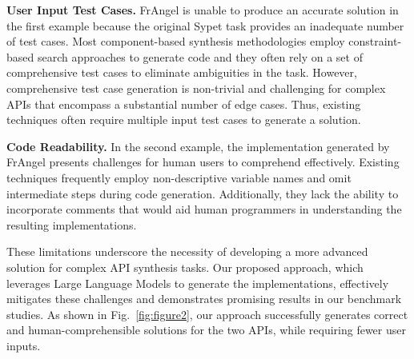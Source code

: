 \noindent\textbf{User Input Test Cases.}
FrAngel is unable to produce an accurate solution in the first example because the original Sypet task provides an inadequate number of test cases. Most component-based synthesis methodologies employ constraint-based search approaches to generate code and they often rely on a set of comprehensive test cases to eliminate ambiguities in the task. However, comprehensive test case generation is non-trivial and challenging for complex APIs that encompass a substantial number of edge cases. Thus, existing techniques often require multiple input test cases to generate a solution.

\noindent\textbf{Code Readability.}
In the second example, the implementation generated by FrAngel presents challenges for human users to comprehend effectively. Existing techniques frequently employ non-descriptive variable names and omit intermediate steps during code generation. Additionally, they lack the ability to incorporate comments that would aid human programmers in understanding the resulting implementations.

These limitations underscore the necessity of developing a more advanced solution for complex API synthesis tasks. Our proposed approach, which leverages Large Language Models to generate the implementations, effectively mitigates these challenges and demonstrates promising results in our benchmark studies. As shown in Fig.~\ref{fig:figure2}, our approach successfully generates correct and human-comprehensible solutions for the two APIs, while requiring fewer user inputs.
